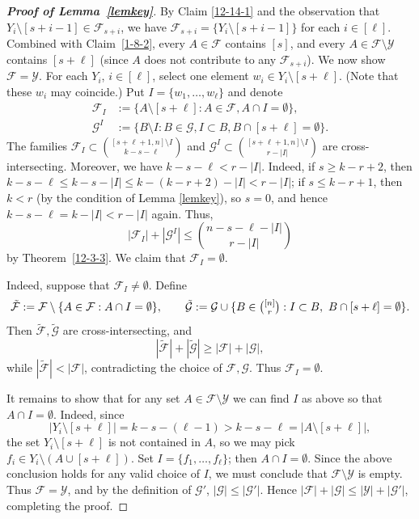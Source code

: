 \documentclass[11pt]{article}
\newcommand{\m}{\mathcal}
\begin{document}
\begin{proof}[{\bf Proof of Lemma~\ref{lemkey}}]
By Claim \ref{12-14-1} and the observation that $Y_i\setminus [s+i-1]\in \m F_{s+i}$, we have $\m F_{s+i}=\{Y_i\setminus [s+i-1]\}$ for each $i\in [\ell]$. 
Combined with Claim~\ref{1-8-2}, every $A\in \m F$ contains $[s]$, and every $A\in \m F\setminus \m Y$ contains $[s+\ell]$ (since $A$ does not contribute to any $\m F_{s+i}$). 
We now show  $\m F=\m Y$.  
For each $Y_i$, $i\in [\ell]$, select one element $w_i\in Y_i\setminus [s+\ell]$. (Note that these $w_i$ may coincide.) 
Put
$I=\{w_1, \dots, w_\ell\}$ and denote
\begin{align*}
\mathcal{F}_I&:=\{ A\setminus [s+\ell]: A\in   \mathcal{F}, A\cap I=\emptyset \},\\
\mathcal{G}^I&:=\{B\setminus I: B\in \mathcal{G}, I\subset B, B\cap [s+\ell] =\emptyset\}.
\end{align*}
The families $\mathcal{F}_I \subset {[s+\ell+1,n]\setminus I \choose k-s-\ell}$ and 
$\mathcal{G}^I\subset {[s+\ell+1,n]\setminus I \choose r-|I|}$ are cross-intersecting. 
Moreover, we have $k-s-\ell< r-|I|$. Indeed, if $s\ge k-r+2$, then $k-s-\ell\le k-s-|I|\le k-(k-r+2)-|I|<r-|I|$; if $s\le k-r+1$, then $k<r$ (by the condition of Lemma \ref{lemkey}), so $s=0$, and hence $k-s-\ell=k-|I|<r-|I|$ again.  Thus, 
\[
|\mathcal{F}_I|+|\mathcal{G}^I|\le {n-s-\ell-|I|\choose r-|I|}
\]
by Theorem~\ref{12-3-3}. We claim that $\mathcal{F}_I=\emptyset$. 

Indeed, suppose that $\mathcal{F}_I\neq\emptyset$. Define
\[
\tilde{\m F}:=\m F\setminus \{A\in \m F: A\cap I=\emptyset\}, 
\qquad 
\tilde{\m G}:=\m G\cup \{B\in \tbinom{[n]}{r}: I\subset B,\ B\cap [s+\ell]=\emptyset\}.
\]
Then $\tilde{\m F},\tilde{\m G}$ are cross-intersecting, and
\[
|\tilde{\m F}|+|\tilde{\m G}|\ge |\m F|+|\m G|,
\]
while $|\tilde{\m F}|<|\m F|$, contradicting the choice of $\m F,\m G$. Thus $\mathcal{F}_I=\emptyset$.

It remains to show that for any set $A\in \m F\setminus \m Y$ we can find $I$ as above so that $A\cap I = \emptyset$. Indeed, since 
\[
|Y_i\setminus [s+\ell]| = k-s-(\ell-1) > k-s-\ell = |A\setminus [s+\ell]|,
\]
the set $Y_i\setminus [s+\ell]$ is not contained in $A$, so
we may pick $f_i\in Y_i\setminus (A\cup [s+\ell])$. Set $I = \{f_1,\ldots, f_\ell\}$; then $A\cap I = \emptyset.$ 
Since the above conclusion holds for any valid choice of $I$, we must conclude that $\m F\setminus \m Y$ is empty. Thus $\m F = \m Y$, and by the definition of $\m G'$, $|\m G| \le |\m G'|$. Hence $|\m F|+|\m G|\le |\m Y|+|\m G'|$, completing the proof.
\end{proof}
\end{document}
